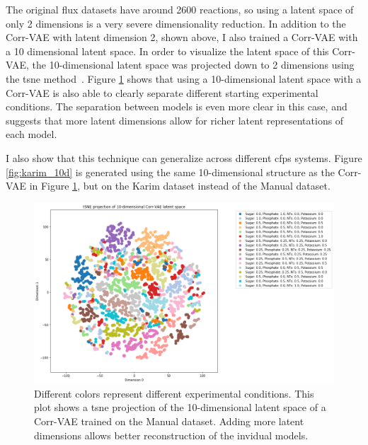 The original flux datasets have around 2600 reactions, so using a latent space of only 2 dimensions is a very severe dimensionality reduction.
In addition to the Corr-VAE with latent dimension 2, shown above, I also trained a Corr-VAE with a 10 dimensional latent space.
In order to visualize the latent space of this Corr-VAE, the 10-dimensional latent space was projected down to 2 dimensions using the \gls{tsne} method~\cite{maaten2008visualizing}.
Figure \ref{fig:manual_10d} shows that using a 10-dimensional latent space with a Corr-VAE is also able to clearly separate different starting experimental conditions.
The separation between models is even more clear in this case, and suggests that more latent dimensions allow for richer latent representations of each model.

I also show that this technique can generalize across different \gls{cfps} systems.
Figure \ref{fig:karim_10d} is generated using the same 10-dimensional structure as the Corr-VAE in Figure \ref{fig:manual_10d}, but on the Karim dataset instead of the Manual dataset.

\begin{figure}[t!]
\begin{center}
\includegraphics[width=1.01\textwidth]{figs/TSNE_hand_latent10.png}
\caption[Projection of the latent space of a 10-dimensional Corr-VAE trained on the Manual dataset]{Different colors represent different experimental conditions.
This plot shows a \gls{tsne} projection of the 10-dimensional latent space of a Corr-VAE trained on the Manual dataset.
Adding more latent dimensions allows better reconstruction of the invidual models.
}
\label{fig:manual_10d}
\end{center}
\end{figure}

